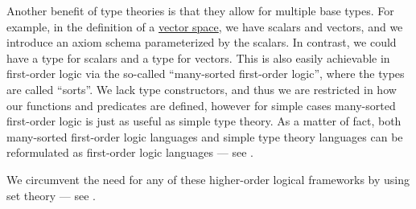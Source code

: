 \begin{remark}
  Another benefit of type theories is that they allow for multiple base types. For example, in the definition of a \hyperref[def:vector_space]{vector space}, we have scalars and vectors, and we introduce an axiom schema parameterized by the scalars. In contrast, we could have a type for scalars and a type for vectors. This is also easily achievable in first-order logic via the so-called \enquote{many-sorted first-order logic}, where the types are called \enquote{sorts}. We lack type constructors, and thus we are restricted in how our functions and predicates are defined, however for simple cases many-sorted first-order logic is just as useful as simple type theory. As a matter of fact, both many-sorted first-order logic languages and simple type theory languages can be reformulated as first-order logic languages --- see \cite[ch. 8]{Farmer2008}.

  We circumvent the need for any of these higher-order logical frameworks by using set theory --- see .
\end{remark}
